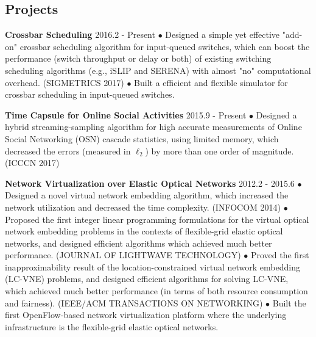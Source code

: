 \documentclass[line,11pt,letter]{/Users/longgong/Dropbox/git-reps/easy_cv/includes/cls/myRes}
\begin{document}
\begin{resume}
\section{Projects}
\vspace{-4pt}
{\setlength{\parskip}{0pt}
{\bf Crossbar Scheduling} \hfill 2016.2 - Present\break
{\hspace*{1em} $\bullet$ Designed a simple yet effective "add-on" crossbar scheduling algorithm for input-queued switches, which can boost the performance (switch throughput or delay or both) of existing switching scheduling algorithms (e.g., iSLIP and SERENA) with almost "no" computational overhead. (SIGMETRICS 2017)\hfill\break}
{\hspace*{1em} $\bullet$ Built a efficient and flexible simulator for crossbar scheduling in input-queued switches.\hfill\break}
\sspace

}
{\setlength{\parskip}{0pt}
{\bf Time Capsule for Online Social Activities} \hfill 2015.9 - Present\break
{\hspace*{1em} $\bullet$ Designed a hybrid streaming-sampling algorithm for high accurate measurements of Online Social Networking (OSN) cascade statistics, using limited memory, which decreased the errors (measured in $\ell_2$) by more than one order of magnitude. (ICCCN 2017)\hfill\break}
\sspace

}
{\setlength{\parskip}{0pt}
{\bf Network Virtualization over Elastic Optical Networks} \hfill 2012.2 - 2015.6\break
{\hspace*{1em} $\bullet$ Designed a novel virtual network embedding algorithm, which increased the network utilization and decreased the time complexity. (INFOCOM 2014)\hfill\break}
{\hspace*{1em} $\bullet$ Proposed the first integer linear programming formulations for the virtual optical network embedding problems in the contexts of flexible-grid elastic optical networks, and designed efficient algorithms which achieved much better performance. (JOURNAL OF LIGHTWAVE TECHNOLOGY)\hfill\break}
{\hspace*{1em} $\bullet$ Proved the first inapproximability result of the location-constrained virtual network embedding (LC-VNE) problems, and designed efficient algorithms for solving LC-VNE, which achieved much better performance (in terms of both resource consumption and fairness). (IEEE/ACM TRANSACTIONS ON NETWORKING)\hfill\break}
{\hspace*{1em} $\bullet$ Built the first OpenFlow-based network virtualization platform where the underlying infrastructure is the flexible-grid elastic optical networks.\hfill\break}
}
\negspace

\end{resume}
\end{document}
